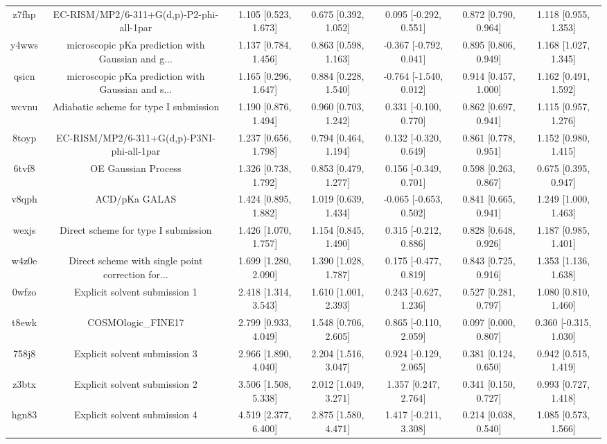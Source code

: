 \documentclass{article}
\begin{document}
\begin{center}
\begin{longtable}{|ccccccc|}
 z7fhp &           EC-RISM/MP2/6-311+G(d,p)-P2-phi-all-1par &  1.105 [0.523, 1.673] &  0.675 [0.392, 1.052] &    0.095 [-0.292, 0.551] &  0.872 [0.790, 0.964] &   1.118 [0.955, 1.353] \\
 y4wws &  microscopic pKa prediction with Gaussian and g... &  1.137 [0.784, 1.456] &  0.863 [0.598, 1.163] &   -0.367 [-0.792, 0.041] &  0.895 [0.806, 0.949] &   1.168 [1.027, 1.345] \\
 qsicn &  microscopic pKa prediction with Gaussian and s... &  1.165 [0.296, 1.647] &  0.884 [0.228, 1.540] &   -0.764 [-1.540, 0.012] &  0.914 [0.457, 1.000] &   1.162 [0.491, 1.592] \\
 wcvnu &             Adiabatic scheme for type I submission &  1.190 [0.876, 1.494] &  0.960 [0.703, 1.242] &    0.331 [-0.100, 0.770] &  0.862 [0.697, 0.941] &   1.115 [0.957, 1.276] \\
 8toyp &         EC-RISM/MP2/6-311+G(d,p)-P3NI-phi-all-1par &  1.237 [0.656, 1.798] &  0.794 [0.464, 1.194] &    0.132 [-0.320, 0.649] &  0.861 [0.778, 0.951] &   1.152 [0.980, 1.415] \\
 6tvf8 &                                OE Gaussian Process &  1.326 [0.738, 1.792] &  0.853 [0.479, 1.277] &    0.156 [-0.349, 0.701] &  0.598 [0.263, 0.867] &   0.675 [0.395, 0.947] \\
 v8qph &                                      ACD/pKa GALAS &  1.424 [0.895, 1.882] &  1.019 [0.639, 1.434] &   -0.065 [-0.653, 0.502] &  0.841 [0.665, 0.941] &   1.249 [1.000, 1.463] \\
 wexjs &                Direct scheme for type I submission &  1.426 [1.070, 1.757] &  1.154 [0.845, 1.490] &    0.315 [-0.212, 0.886] &  0.828 [0.648, 0.926] &   1.187 [0.985, 1.401] \\
 w4z0e &  Direct scheme with single point correction for... &  1.699 [1.280, 2.090] &  1.390 [1.028, 1.787] &    0.175 [-0.477, 0.819] &  0.843 [0.725, 0.916] &   1.353 [1.136, 1.638] \\
 0wfzo &                      Explicit solvent submission 1 &  2.418 [1.314, 3.543] &  1.610 [1.001, 2.393] &    0.243 [-0.627, 1.236] &  0.527 [0.281, 0.797] &   1.080 [0.810, 1.460] \\
 t8ewk &                                 COSMOlogic\_FINE17 &  2.799 [0.933, 4.049] &  1.548 [0.706, 2.605] &    0.865 [-0.110, 2.059] &  0.097 [0.000, 0.807] &  0.360 [-0.315, 1.030] \\
 758j8 &                      Explicit solvent submission 3 &  2.966 [1.890, 4.040] &  2.204 [1.516, 3.047] &    0.924 [-0.129, 2.065] &  0.381 [0.124, 0.650] &   0.942 [0.515, 1.419] \\
 z3btx &                      Explicit solvent submission 2 &  3.506 [1.508, 5.338] &  2.012 [1.049, 3.271] &     1.357 [0.247, 2.764] &  0.341 [0.150, 0.727] &   0.993 [0.727, 1.418] \\
 hgn83 &                      Explicit solvent submission 4 &  4.519 [2.377, 6.400] &  2.875 [1.580, 4.471] &    1.417 [-0.211, 3.308] &  0.214 [0.038, 0.540] &   1.085 [0.573, 1.566] \\
\end{longtable}
\end{center}
\end{document}
